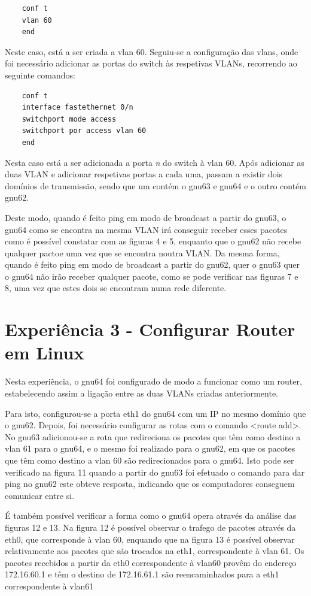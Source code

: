 \documentclass[article, a4paper, 11pt, oneside]{memoir}
\begin{document}
\begin{lstlisting}
	conf t
	vlan 60
	end
\end{lstlisting} 
Neste caso, está a ser criada a vlan 60. 
Seguiu-se a configuração das vlans, onde foi necessário adicionar as portas do switch às respetivas VLANs, recorrendo ao seguinte comandos:

\begin{lstlisting}
	conf t
	interface fastethernet 0/n
	switchport mode access
	switchport por access vlan 60
	end
\end{lstlisting} 

Nesta caso está a ser adicionada a porta \emph{n} do switch à vlan 60. 
Após adicionar as duas VLAN e adicionar respetivas portas a cada uma, 
passam a existir dois domínios de transmissão, sendo que um contém o gnu63 e gnu64 e o outro contém gnu62.

Deste modo, quando é feito ping em modo de broadcast a partir do gnu63, o gnu64 como se encontra na mesma VLAN irá conseguir 
receber esses pacotes como é possível constatar com as figuras 4 e 5, enquanto que o gnu62 não recebe qualquer pactoe uma vez que se encontra noutra VLAN.
Da mesma forma, quando é feito ping em modo de broadcast a partir do gnu62, quer o gnu63 quer o gnu64 não irão receber qualquer pacote, como se pode verificar
nas figuras 7 e 8, uma vez que estes dois se encontram numa rede diferente.


\section{Experiência 3 - Configurar Router em Linux}

Nesta experiência, o gnu64 foi configurado de modo a funcionar como um router, estabelecendo assim a ligação entre as duas VLANs criadas anteriormente.

Para isto, configurou-se a porta eth1 do gnu64 com um IP no mesmo domínio que o gnu62. Depois, foi necessário configurar as rotas com o comando <route add>. 
No gnu63 adicionou-se a rota que redireciona os pacotes que têm como destino a vlan 61 para o gnu64, 
e o mesmo foi realizado para o gnu62, em que os pacotes que têm como destino a vlan 60 são redirecionados para o gnu64.
Isto pode ser verificado na figura 11 quando a partir do gnu63 foi efetuado o comando para dar ping no gnu62 este obteve resposta, indicando que os computadores conseguem comunicar entre si.

É também possível verificar a forma como o gnu64 opera através da análise das figuras 12 e 13. Na figura 12 é possível observar o trafego de pacotes através da eth0, 
que corresponde à vlan 60, enquando que na figura 13 é possível observar relativamente aos pacotes que são trocados na eth1, correspondente à vlan 61. Os pacotes recebidos a partir da
eth0 correspondente à vlan60 provêm do endereço 172.16.60.1 e têm o destino de 172.16.61.1 são reencaminhados para a eth1 correspondente à vlan61
\end{document}
